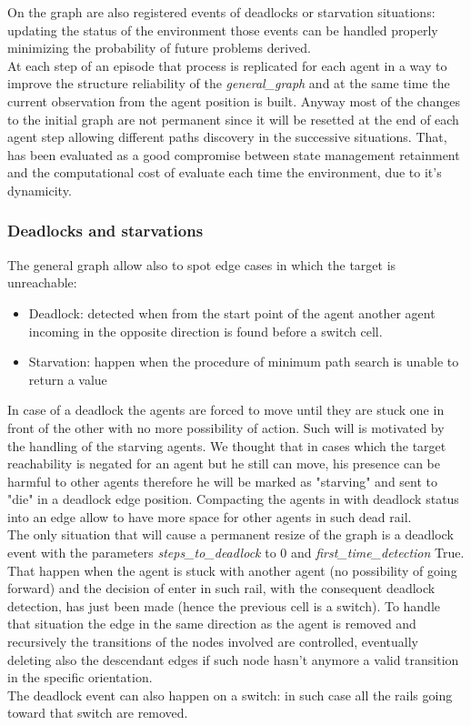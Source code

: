 On the graph are also registered events of deadlocks or starvation situations: updating the status of the environment those events can be handled properly minimizing the probability of future problems derived.\\
At each step of an episode that process is replicated for each agent in a way to improve the structure reliability of the \textit{general\_graph} and at the same time the current observation from the agent position is built. Anyway most of the changes to the initial graph are not permanent since it will be resetted at the end of each agent step allowing different paths discovery in the successive situations. That, has been evaluated as a good compromise between state management retainment and the computational cost of evaluate each time the environment, due to it's dynamicity.

\subsubsection{Deadlocks and starvations}
The general graph allow also to spot edge cases in which the target is unreachable:
\begin{itemize}
    \item Deadlock: detected when from the start point of the agent another agent incoming in the opposite direction is found before a switch cell.
    \item Starvation: happen when the procedure of minimum path search is unable to return a value 
\end{itemize}
In case of a deadlock the agents are forced to move until they are stuck one in front of the other with no more possibility of action. Such will is motivated by the handling of the starving agents. We thought that in cases which the target reachability is negated for an agent but he still can move, his presence can be harmful to other agents therefore he will be marked as "starving" and sent to "die" in a deadlock edge position. Compacting the agents in with deadlock status into an edge allow to have more space for other agents in such dead rail.\\
The only situation that will cause a permanent resize of the graph is a deadlock event with the parameters \textit{steps\_to\_deadlock} to 0 and \textit{first\_time\_detection} True. That happen when the agent is stuck with another agent (no possibility of going forward) and the decision of enter in such rail, with the consequent deadlock detection, has just been made (hence the previous cell is a switch). To handle that situation the edge in the same direction as the agent is removed and recursively the transitions of the nodes involved are controlled, eventually deleting also the descendant edges if such node hasn't anymore a valid transition in the specific orientation.\\\noindent
The deadlock event can also happen on a switch: in such case all the rails going toward that switch are removed.

